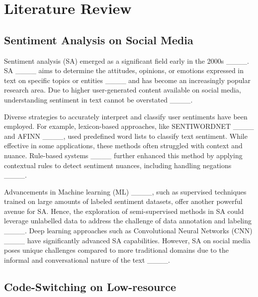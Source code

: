 \section{Literature Review}
\label{sxn:rw}
\subsection{Sentiment Analysis on Social Media}
Sentiment analysis (SA) emerged as a significant field early in the 2000s ____.  
SA ____ aims to determine the attitudes, opinions, or emotions expressed in text on specific topics or entities ____ and has become an increasingly popular research area. Due to higher user-generated content available on social media, understanding  sentiment in text cannot be overstated ____. 

Diverse strategies to accurately interpret and classify user sentiments have been employed. For example, lexicon-based approaches, like SENTIWORDNET ____ and AFINN ____, used predefined word lists to classify text sentiment. While effective in some applications, these methods often struggled with context and nuance. Rule-based systems ____ further enhanced this method by applying contextual rules to detect sentiment nuances, including handling negations ____.

Advancements in Machine learning (ML) ____, such as supervised techniques trained on large amounts of labeled sentiment datasets, offer another powerful avenue for SA. 
Hence, the exploration of semi-supervised methods in SA could leverage unlabelled data to address the challenge of data annotation and labeling ____. Deep learning approaches such as Convolutional Neural Networks (CNN) ____ have significantly advanced SA capabilities. However, SA on social media poses unique challenges compared to more traditional domains due to the informal and conversational nature of the text ____. 

\subsection{Code-Switching on Low-resource}

